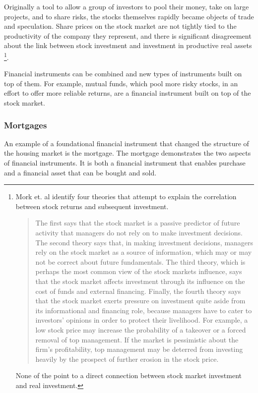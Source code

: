 Originally a tool to allow a group of investors to pool their money, take on large projects, and to share risks, the stocks themselves rapidly became objects of trade and speculation. Share prices on the stock market are not tightly tied to the productivity of the company they represent, %
and there is significant disagreement about the link between stock investment and investment in productive real assets \footnote{Mork et. al \cite{morckStockMarketInvestment1990} identify four theories that attempt to explain the correlation between stock returns and subsequent investment. \begin{quotation}The first says that the stock market is a passive predictor of future activity that managers do not rely on to make investment decisions. The second theory says that, in making investment decisions, managers rely on the stock market as a source of information, which may or may not be correct about future fundamentals. The third theory, which is perhaps the most common view of the stock markets influence, says that the stock market affects investment through its influence on the cost of funds and external financing. Finally, the fourth theory says that the stock market exerts pressure on investment quite aside from its informational and financing role, because managers have to cater to investors' opinions in order to protect their livelihood. For example, a low stock price may increase the probability of a takeover or a forced removal of top management. If the market is pessimistic about the firm's profitability, top management may be deterred from investing heavily by the prospect of further erosion in the stock price.\end{quotation} None of the point to a direct connection between stock market investment and real investment.}. 

Financial instruments can be combined and new types of instruments built on top of them. For example,
mutual funds, which pool more risky stocks, in an effort to offer more reliable returns, are a financial instrument built on top of the stock market.

\subsubsection{Mortgages}
An example of a foundational financial instrument that changed the structure of the housing market is the mortgage. The mortgage demonstrates the two aspects of financial instruments. It is both a financial instrument that enables  purchase and a financial asset that can be bought and sold. 

